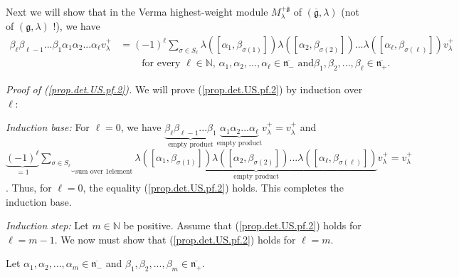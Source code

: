 \documentclass
[numbers=enddot,12pt,final,onecolumn,german,notitlepage]{scrartcl}%
\theoremstyle{definition}
\begin{document}
Next we will show that in the Verma highest-weight module $M_{\lambda
}^{+\overline{\mathfrak{g}}}$ of $\left(  \overline{\mathfrak{g}}%
,\lambda\right)  $ (not of $\left(  \mathfrak{g},\lambda\right)  $ !), we have%
\begin{align}
\beta_{\ell}\beta_{\ell-1}...\beta_{1}\alpha_{1}\alpha_{2}...\alpha_{\ell
}v_{\lambda}^{+}  &  =\left(  -1\right)  ^{\ell}\sum\limits_{\sigma\in
S_{\ell}}\lambda\left(  \left[  \alpha_{1},\beta_{\sigma\left(  1\right)
}\right]  \right)  \lambda\left(  \left[  \alpha_{2},\beta_{\sigma\left(
2\right)  }\right]  \right)  ...\lambda\left(  \left[  \alpha_{\ell}%
,\beta_{\sigma\left(  \ell\right)  }\right]  \right)  v_{\lambda}%
^{+}\label{prop.det.US.pf.2}\\
&  \ \ \ \ \ \ \ \ \ \ \text{for every }\ell\in\mathbb{N}\text{, }\alpha
_{1},\alpha_{2},...,\alpha_{\ell}\in\overline{\mathfrak{n}_{-}}\text{ and
}\beta_{1},\beta_{2},...,\beta_{\ell}\in\overline{\mathfrak{n}_{+}}%
\text{.}\nonumber
\end{align}


\textit{Proof of (\ref{prop.det.US.pf.2}).} We will prove
(\ref{prop.det.US.pf.2}) by induction over $\ell$:

\textit{Induction base:} For $\ell=0$, we have $\underbrace{\beta_{\ell}%
\beta_{\ell-1}...\beta_{1}}_{\text{empty product}}\underbrace{\alpha_{1}%
\alpha_{2}...\alpha_{\ell}}_{\text{empty product}}v_{\lambda}^{+}=v_{\lambda
}^{+}$ and \newline$\underbrace{\left(  -1\right)  ^{\ell}}_{=1}%
\underbrace{\sum\limits_{\sigma\in S_{\ell}}}_{\text{sum over }1\text{
element}}\underbrace{\lambda\left(  \left[  \alpha_{1},\beta_{\sigma\left(
1\right)  }\right]  \right)  \lambda\left(  \left[  \alpha_{2},\beta
_{\sigma\left(  2\right)  }\right]  \right)  ...\lambda\left(  \left[
\alpha_{\ell},\beta_{\sigma\left(  \ell\right)  }\right]  \right)
}_{\text{empty product}}v_{\lambda}^{+}=v_{\lambda}^{+}$. Thus, for $\ell=0$,
the equality (\ref{prop.det.US.pf.2}) holds. This completes the induction base.

\textit{Induction step:} Let $m\in\mathbb{N}$ be positive. Assume that
(\ref{prop.det.US.pf.2}) holds for $\ell=m-1$. We now must show that
(\ref{prop.det.US.pf.2}) holds for $\ell=m$.

Let $\alpha_{1},\alpha_{2},...,\alpha_{m}\in\overline{\mathfrak{n}_{-}}$ and
$\beta_{1},\beta_{2},...,\beta_{m}\in\overline{\mathfrak{n}_{+}}$.
\end{document}
